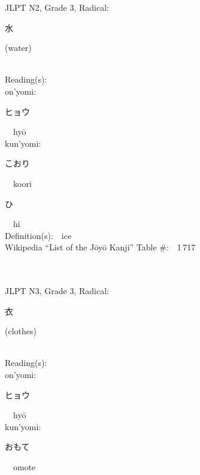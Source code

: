 \begin{multicols}{2}
{JLPT N2, Grade 3, Radical:\ \ {\begin{CJK}{UTF8}{min} 水 \end{CJK}} (water) } \\
Reading(s):\ \ \\
{\hspace*{1em}}on'yomi:\ \ \\
{\hspace*{2em}}{\begin{CJK}{UTF8}{min} ヒョウ \end{CJK}}\ \ hy\=o\ \ \\
{\hspace*{1em}}kun'yomi:\ \ \\
{\hspace*{2em}}{\begin{CJK}{UTF8}{min} こおり \end{CJK}}\ \ koori\ \ \\
{\hspace*{2em}}{\begin{CJK}{UTF8}{min} ひ \end{CJK}}\ \ hi\ \ \\
Definition(s):\ \ ice \\
Wikipedia ``List of the J\=oy\=o Kanji'' Table \#:\ \ 1\,717 \\
\ \ \\
{\fontsize{34pt}{40pt}  }\ \ \\  %
{JLPT N3, Grade 3, Radical:\ \ {\begin{CJK}{UTF8}{min} 衣 \end{CJK}} (clothes) } \\
Reading(s):\ \ \\
{\hspace*{1em}}on'yomi:\ \ \\
{\hspace*{2em}}{\begin{CJK}{UTF8}{min} ヒョウ \end{CJK}}\ \ hy\=o\ \ \\
{\hspace*{1em}}kun'yomi:\ \ \\
{\hspace*{2em}}{\begin{CJK}{UTF8}{min} おもて \end{CJK}}\ \ omote\ \ \\

\end{multicols}
